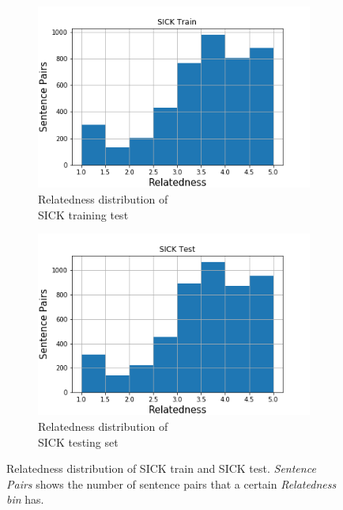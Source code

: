 \begin{enumerate}
\begin{figure}
	\captionsetup[subfigure]{justification=centering}
	\centering
	\begin{subfigure}[b]{.5\textwidth}
		\centering
		\includegraphics[width=\textwidth]{figures/semantic_textual_similarity/introduction/sick_train_relatedness_hist.png}
		\caption{Relatedness distribution of \\ SICK training test}
		\label{fig:sick_train_relatedness}
	\end{subfigure}%
	\begin{subfigure}[b]{.5\textwidth}
		\centering
		\includegraphics[width=\textwidth]{figures/semantic_textual_similarity/introduction/sick_test_relatedness_hist.png}
		\caption{Relatedness distribution of \\ SICK testing set}
		\label{fig:sick_test_relatedness}
	\end{subfigure}
	\caption[Relatedness distribution of SICK train and SICK test]{Relatedness distribution of SICK train and SICK test. \textit{Sentence Pairs} shows the number of sentence pairs that a certain \textit{Relatedness bin} has.}
	\label{fig:sick_relatedness}
\end{figure}



\end{enumerate}
